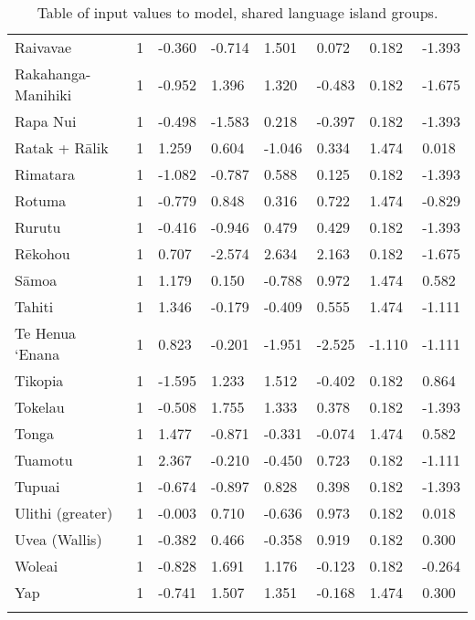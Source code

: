 \begin{longtable}{p{4.5cm}p{1.4cm}p{1.4cm}p{1.4cm}p{1.4cm}p{1.7cm}p{1.7cm}p{1.7cm}}
  Raivavae & 1 & -0.360 & -0.714 & 1.501 & 0.072 & 0.182 & -1.393 \\ 
  Rakahanga-Manihiki & 1 & -0.952 & 1.396 & 1.320 & -0.483 & 0.182 & -1.675 \\ 
  Rapa Nui & 1 & -0.498 & -1.583 & 0.218 & -0.397 & 0.182 & -1.393 \\ 
  Ratak + Rālik & 1 & 1.259 & 0.604 & -1.046 & 0.334 & 1.474 & 0.018 \\ 
  Rimatara & 1 & -1.082 & -0.787 & 0.588 & 0.125 & 0.182 & -1.393 \\ 
  Rotuma & 1 & -0.779 & 0.848 & 0.316 & 0.722 & 1.474 & -0.829 \\ 
  Rurutu & 1 & -0.416 & -0.946 & 0.479 & 0.429 & 0.182 & -1.393 \\ 
  Rēkohou & 1 & 0.707 & -2.574 & 2.634 & 2.163 & 0.182 & -1.675 \\ 
  Sāmoa & 1 & 1.179 & 0.150 & -0.788 & 0.972 & 1.474 & 0.582 \\ 
  Tahiti & 1 & 1.346 & -0.179 & -0.409 & 0.555 & 1.474 & -1.111 \\ 
  Te Henua ‘Enana & 1 & 0.823 & -0.201 & -1.951 & -2.525 & -1.110 & -1.111 \\ 
  Tikopia & 1 & -1.595 & 1.233 & 1.512 & -0.402 & 0.182 & 0.864 \\ 
  Tokelau & 1 & -0.508 & 1.755 & 1.333 & 0.378 & 0.182 & -1.393 \\ 
  Tonga & 1 & 1.477 & -0.871 & -0.331 & -0.074 & 1.474 & 0.582 \\ 
  Tuamotu & 1 & 2.367 & -0.210 & -0.450 & 0.723 & 0.182 & -1.111 \\ 
  Tupuai & 1 & -0.674 & -0.897 & 0.828 & 0.398 & 0.182 & -1.393 \\ 
  Ulithi (greater) & 1 & -0.003 & 0.710 & -0.636 & 0.973 & 0.182 & 0.018 \\ 
  Uvea (Wallis) & 1 & -0.382 & 0.466 & -0.358 & 0.919 & 0.182 & 0.300 \\ 
  Woleai & 1 & -0.828 & 1.691 & 1.176 & -0.123 & 0.182 & -0.264 \\ 
  Yap & 1 & -0.741 & 1.507 & 1.351 & -0.168 & 1.474 & 0.300 \\ 
   \bottomrule
\caption{Table of input values to model, shared language island groups.} 
\label{appendix_medium_table}
\end{longtable}
